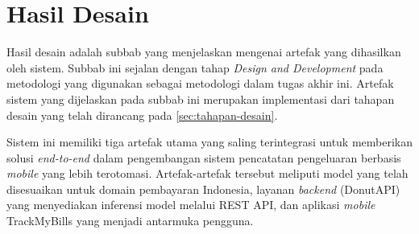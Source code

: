 \section{Hasil Desain}
\label{sec:hasil-desain}

Hasil desain adalah subbab yang menjelaskan mengenai artefak yang dihasilkan oleh sistem. Subbab ini sejalan dengan tahap \emph{Design and Development} pada metodologi \dsrm{} yang digunakan sebagai metodologi dalam tugas akhir ini. Artefak sistem yang dijelaskan pada subbab ini merupakan implementasi dari tahapan desain yang telah dirancang pada \autoref{sec:tahapan-desain}. 

Sistem ini memiliki tiga artefak utama yang saling terintegrasi untuk memberikan solusi \emph{end-to-end} dalam pengembangan sistem pencatatan pengeluaran berbasis \emph{mobile} yang lebih terotomasi. Artefak-artefak tersebut meliputi model \donut{} yang telah disesuaikan untuk domain pembayaran Indonesia, layanan \emph{backend} (DonutAPI) yang menyediakan inferensi model melalui REST API, dan aplikasi \emph{mobile} TrackMyBills yang menjadi antarmuka pengguna.







